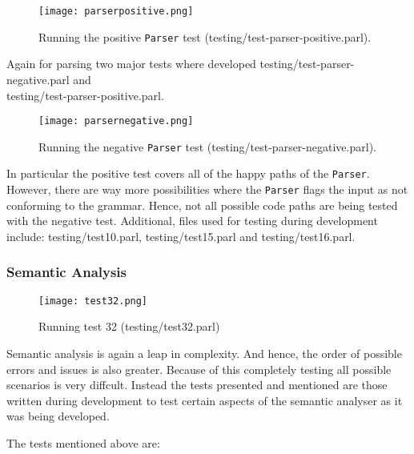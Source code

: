 \begin{figure}[H]
\centering
\texttt{[image: parserpositive.png]}
\caption{Running the positive \texttt{Parser} test
(testing/test-parser-positive.parl).}
\end{figure}

Again for parsing two major tests where developed
testing/test-parser-negative.parl and \\
testing/test-parser-positive.parl.

\begin{figure}[H]
\centering
\texttt{[image: parsernegative.png]}
\caption{Running the negative \texttt{Parser} test
(testing/test-parser-negative.parl).}
\end{figure}

In particular the positive test covers all of the happy paths of
the \texttt{Parser}. However, there are way more possibilities
where the \texttt{Parser} flags the input as not conforming to
the grammar. Hence, not all possible code paths are being tested
with the negative test. Additional, files used for testing
during development include: testing/test10.parl,
testing/test15.parl and testing/test16.parl.

\subsubsection{Semantic Analysis}

\begin{figure}[H]
\centering
\texttt{[image: test32.png]}
\caption{Running test 32 (testing/test32.parl)}
\end{figure}

Semantic analysis is again a leap in complexity. And hence, the
order of possible errors and issues is also greater. Because of
this completely testing all possible scenarios is very diffcult.
Instead the tests presented and mentioned are those written
during development to test certain aspects of the semantic
analyser as it was being developed.

The tests mentioned above are:


